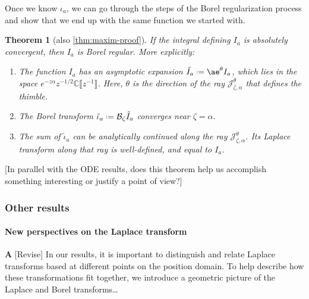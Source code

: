 \documentclass{article}
\newcommand{\C}{\mathbb{C}}
\newcommand{\series}[1]{\tilde{#1}}
\newcommand*{\defeq}{\mathrel{\vcenter{\baselineskip0.5ex \lineskiplimit0pt
                     \hbox{\scriptsize.}\hbox{\scriptsize.}}}%
                     =}
\newcommand{\borel}{\mathcal{B}}
\newcommand{\aexp}{\mathrm{\ae}}
\theoremstyle{definition}
\theoremstyle{plain}
\newtheorem{theorem}{Theorem}[section]
\newenvironment{todo}{\color{Coral}}{\color{black}}
\newenvironment{draft}{\color{SlateBlue}}{\color{black}}
\begin{document}
Once we know $\iota_a$, we can go through the steps of the Borel regularization process and show that we end up with the same function we started with.
\begin{theorem}[also \ref{thm:maxim-proof}]\label{thm:maxim}
If the integral defining $I_a$ is absolutely convergent, then $I_a$ is Borel regular. More explicitly:
\begin{enumerate}
\item\label{part-1} The function $I_a$ has an asymptotic expansion $\series{I}_a \defeq \aexp^\theta I_a$, which lies in the space $e^{-z \alpha} z^{-1/2} \C\llbracket z^{-1}\rrbracket$. Here, $\theta$ is the direction of the ray $\mathcal{J}^\theta_{\zeta, \alpha}$ that defines the thimble.
\item\label{part-2} The Borel transform $\series{\iota}_a \defeq \borel_\zeta \series{I}_a$ converges near $\zeta = \alpha$.
\item\label{part-3} The sum of $\series{\iota}_a$ can be analytically continued along the ray $\mathcal{J}_{\zeta, \alpha}^\theta$. Its Laplace transform along that ray is well-defined, and equal to $I_a$.
\end{enumerate}
\end{theorem}
\begin{todo}[In parallel with the ODE results, does this theorem help us accomplish something interesting or justify a point of view?]\end{todo}
%
\subsubsection{Other results}\label{sec:other_results}
%
\paragraph{New perspectives on the Laplace transform}
%
\begin{todo}\textbf{A} [Revise]\end{todo} \begin{draft}In our results, it is important to distinguish and relate Laplace transforms based at different points on the position domain. To help describe how these transformations fit together, we introduce a geometric picture of the Laplace and Borel transforms\ldots\end{draft}
\end{document}
